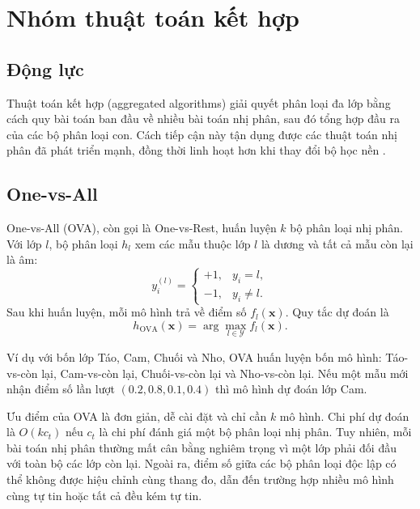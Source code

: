 \section{Nhóm thuật toán kết hợp}

\subsection{Động lực}

Thuật toán kết hợp (aggregated algorithms) giải quyết phân loại đa lớp bằng cách quy bài toán ban đầu về nhiều bài toán nhị phân, sau đó tổng hợp đầu ra của các bộ phân loại con. Cách tiếp cận này tận dụng được các thuật toán nhị phân đã phát triển mạnh, đồng thời linh hoạt hơn khi thay đổi bộ học nền \cite{dietterich1995}.

\subsection{One-vs-All}

One-vs-All (OVA), còn gọi là One-vs-Rest, huấn luyện $k$ bộ phân loại nhị phân. Với lớp $l$, bộ phân loại $h_l$ xem các mẫu thuộc lớp $l$ là dương và tất cả mẫu còn lại là âm:
\[
  y_i^{(l)}=
  \begin{cases}
    +1, & y_i=l,\\
    -1, & y_i\neq l.
  \end{cases}
\]
Sau khi huấn luyện, mỗi mô hình trả về điểm số $f_l(\bm{x})$. Quy tắc dự đoán là
\[
  h_{\text{OVA}}(\bm{x})=\arg\max_{l\in\mathcal{Y}} f_l(\bm{x}).
\]

\begin{algorithm}[H]
\caption{Huấn luyện One-vs-All}
\end{algorithm}

Ví dụ với bốn lớp Táo, Cam, Chuối và Nho, OVA huấn luyện bốn mô hình: Táo-vs-còn lại, Cam-vs-còn lại, Chuối-vs-còn lại và Nho-vs-còn lại. Nếu một mẫu mới nhận điểm số lần lượt $(0.2,0.8,0.1,0.4)$ thì mô hình dự đoán lớp Cam.

Ưu điểm của OVA là đơn giản, dễ cài đặt và chỉ cần $k$ mô hình. Chi phí dự đoán là $O(kc_t)$ nếu $c_t$ là chi phí đánh giá một bộ phân loại nhị phân. Tuy nhiên, mỗi bài toán nhị phân thường mất cân bằng nghiêm trọng vì một lớp phải đối đầu với toàn bộ các lớp còn lại. Ngoài ra, điểm số giữa các bộ phân loại độc lập có thể không được hiệu chỉnh cùng thang đo, dẫn đến trường hợp nhiều mô hình cùng tự tin hoặc tất cả đều kém tự tin.

